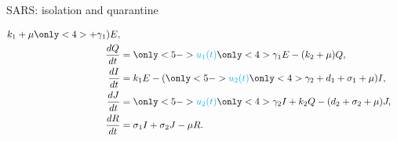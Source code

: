 \begin{frame}{SARS: isolation and quarantine}
{\begin{textblock*}{65mm}
\begin{equation*}
\begin{aligned}
{                }
                      k_1 + \mu
                      \only<4>{+\gamma_1}
                )E,
            \\
            \dfrac{dQ}{dt} &=
                \only<5->{
                    \textcolor{cyan}{u_1(t)}
                }
                 \only<4>{\gamma_1}
                 E - (k_2 + \mu) Q,
            \\
            \dfrac{dI}{dt} &=
                k_1 E 
                -(
                \only<5->{
                    \textcolor{cyan}{u_2(t)}
                }
                \only<4>{\gamma_2}
                + d_1  + \sigma_1 
                + \mu) I,
            \\
            \dfrac{dJ}{dt} &=
                \only<5->{
                    \textcolor{cyan}{u_2(t)}
                }
                \only<4>{\gamma_2}  
                  I 
                + k_2 Q
                - (d_2 + \sigma_2 + \mu) J,
            \\
            \dfrac{dR}{dt} &=
                \sigma_1 I
                +\sigma_2 J
                - \mu R.
        \end{aligned}
     \end{equation*}
    \end{textblock*}
    }
    
\end{frame}